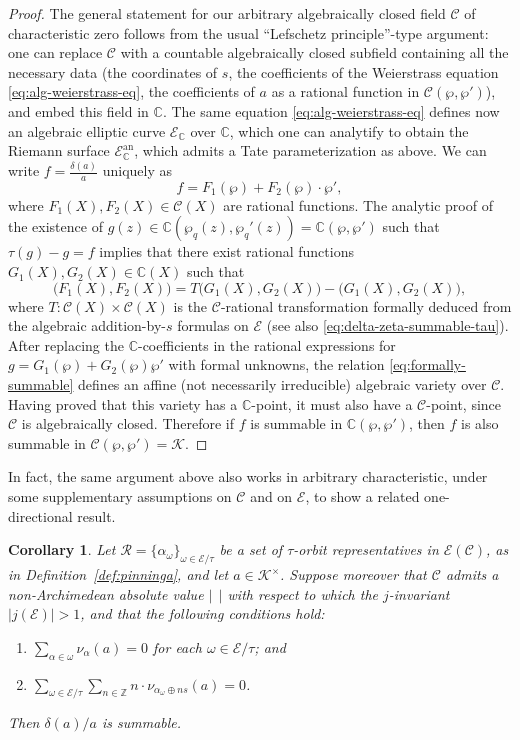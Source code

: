 \documentclass[preprint,12pt]{elsarticle}
\numberwithin{equation}{section} %
\theoremstyle{theorem}
\newtheorem{corollary}[theorem]{Corollary}
\theoremstyle{definition}
\newcommand{\Ca}{\mathcal{C}} %
\newcommand{\bk}{\mathcal{K}} %
\newcommand{\ec}{\mathcal{E}} %
\newcommand{\orbita}{{\ec/\tau}} %
\newcommand{\C}{\mathbb{C}} %
\newcommand{\Z}{\mathbb{Z}} %
\begin{document}
\begin{proof}
        The general statement for our arbitrary algebraically closed field $\Ca$ of characteristic zero follows from the usual ``Lefschetz principle''-type argument: one can replace $\Ca$ with a countable algebraically closed subfield containing all the necessary data (the coordinates of $s$, the coefficients of the Weierstrass equation \eqref{eq:alg-weierstrass-eq}, the coefficients of $a$ as a rational function in $\Ca(\wp,\wp')$), and embed this field in $\C$. The same equation \eqref{eq:alg-weierstrass-eq} defines now an algebraic elliptic curve $\ec_\C$ over $\C$, which one can analytify to obtain the Riemann surface $\ec_\C^\mathrm{an}$, which admits a Tate parameterization as above. We can write $f=\frac{\delta(a)}{a}$ uniquely as \[f=F_1(\wp)+F_2(\wp)\cdot\wp',\] where $F_1(X),F_2(X)\in\Ca(X)$ are rational functions. The analytic proof of the existence of $g(z)\in\C(\wp_q(z),\wp_q'(z))=\C(\wp,\wp')$ such that $\tau(g)-g=f$ implies that there exist rational functions $G_1(X),G_2(X)\in\C(X)$ such that \begin{equation}\label{eq:formally-summable}\bigl(F_1(X),F_2(X)\bigr)=T\bigl(G_1(X),G_2(X)\bigr)-\bigl(G_1(X),G_2(X)\bigr),\end{equation} where $T:\Ca(X)\times\Ca(X)$ is the $\Ca$-rational transformation formally deduced from the algebraic addition-by-$s$ formulas on $\ec$ \cite[\S III.2]{SilvermanIntro} (see also \eqref{eq:delta-zeta-summable-tau}). After replacing the $\C$-coefficients in the rational expressions for $g=G_1(\wp)+G_2(\wp)\wp'$ with formal unknowns, the relation \eqref{eq:formally-summable} defines an affine (not necessarily irreducible) algebraic variety over $\Ca$. Having proved that this variety has a $\C$-point, it must also have a $\Ca$-point, since $\Ca$ is algebraically closed. Therefore if $f$ is summable in $\C(\wp,\wp')$, then $f$ is also summable in $\Ca(\wp,\wp')=\bk$.
        \end{proof}

        In fact, the same argument above also works in arbitrary characteristic, under some supplementary assumptions on $\Ca$ and on $\ec$, to show a related one-directional result.

        \begin{corollary} \label{cor:dlog-integrability-0}
            Let $\mathcal{R}=\{\alpha_\omega\}_{\omega\in\orbita}$ be a set of \mbox{$\tau$-orbit} representatives in $\ec(\Ca)$, as in Definition~\ref{def:pinninga}, and let $a\in\bk^\times$. Suppose moreover that $\Ca$ admits a non-Archimedean absolute value $| \ \ |$ with respect to which the $j$-invariant $|j(\ec)|>1$, and that the following conditions hold:
        \begin{enumerate}
            \item $\displaystyle \sum_{\alpha\in\omega}\nu_\alpha(a)=0$ for each $\omega\in\orbita$; and
            \item $\displaystyle \sum_{\omega\in\orbita}\sum_{n\in\Z}n\cdot\nu_{\alpha_\omega\oplus ns}(a)=0$.
        \end{enumerate}
        Then $\delta(a)/a$ is summable.
        \end{corollary}
\end{document}
